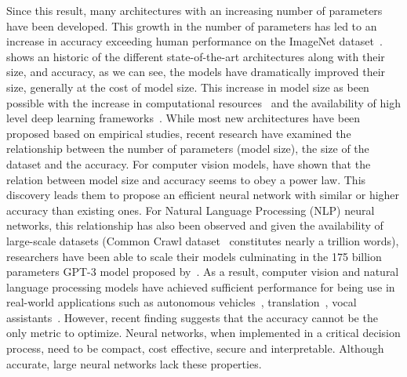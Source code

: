 Since this result, many architectures with an increasing number of parameters have been developed.
This growth in the number of parameters has led to an increase in accuracy exceeding human performance on the ImageNet dataset~\cite{he2015delving}.
 shows an historic of the different state-of-the-art architectures along with their size, and accuracy, as we can see, the models have dramatically improved their size, generally at the cost of model size.
This increase in model size as been possible with the increase in computational resources~\cite{huang2019gpipe} and the availability of high level deep learning frameworks~\cite{tensorflow2015-whitepaper,paszke2019pytorch}.
While most new architectures have been proposed based on empirical studies, recent research \cite{tan2019efficientnet,rosenfeld2020a} have examined the relationship between the number of parameters (model size), the size of the dataset and the accuracy.
For computer vision models, \citet{tan2019efficientnet} have shown that the relation between model size and accuracy seems to obey a power law. 
This discovery leads them to propose an efficient neural network with similar or higher accuracy than existing ones.  
For Natural Language Processing (NLP) neural networks, this relationship has also been observed and given the availability of large-scale datasets (Common Crawl dataset~\cite{raffel2019exploring} constitutes nearly a trillion words), researchers have been able to scale their models culminating in the 175 billion parameters GPT-3 model proposed by~\citet{brown2020language}. 
As a result, computer vision and natural language processing models have achieved sufficient performance for being use in real-world applications such as autonomous vehicles~\cite{fagnant2015preparing}, translation~\cite{wu2016google}, vocal assistants~\cite{li2017acoustic}.
However, recent finding suggests that the accuracy cannot be the only metric to optimize. 
Neural networks, when implemented in a critical decision process, need to be compact, cost effective, secure and interpretable.
Although accurate, large neural networks lack these properties.


